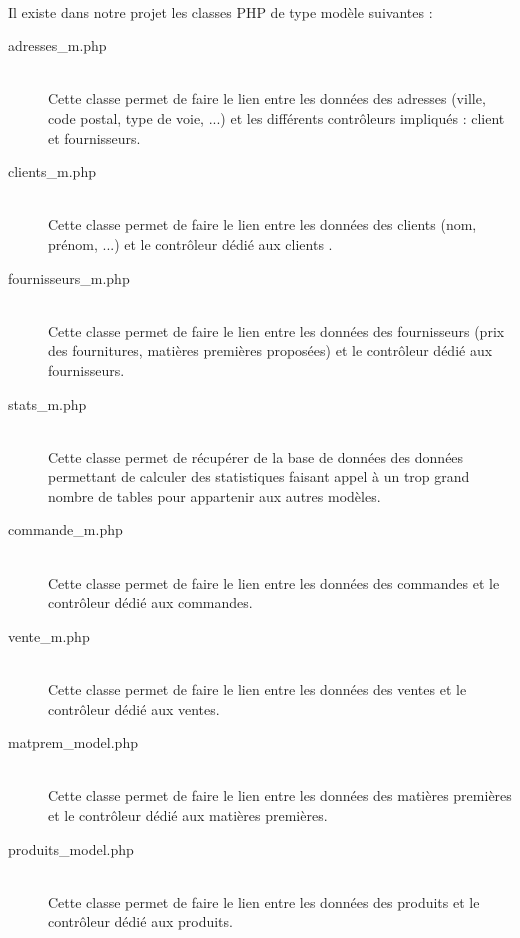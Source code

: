     \paragraph{}
        Il existe dans notre projet les classes PHP de type modèle suivantes :
        \begin{description}
            \item[adresses\_m.php]\hfill \\
                Cette classe permet de faire le lien entre les données des
                adresses (ville, code postal, type de voie, ...) et les
                différents contrôleurs impliqués : client et fournisseurs.
            \item[clients\_m.php]\hfill \\
                Cette classe permet de faire le lien entre les données des
                clients (nom, prénom, ...) et le contrôleur dédié aux clients
                .
            \item[fournisseurs\_m.php]\hfill \\
                Cette classe permet de faire le lien entre les données des
                fournisseurs (prix des fournitures, matières premières
                proposées) et le contrôleur dédié aux fournisseurs.
            \item[stats\_m.php]\hfill \\
                Cette classe permet de récupérer de la base de données des
                données permettant de calculer des statistiques faisant appel
                à un trop grand nombre de tables pour appartenir aux autres
                modèles.
            \item[commande\_m.php]\hfill \\
                Cette classe permet de faire le lien
                entre les données des commandes et le contrôleur dédié aux
                commandes.
            \item[vente\_m.php]\hfill \\
                Cette classe permet de faire le lien entre les données des
                ventes et le contrôleur dédié aux ventes.
            \item[matprem\_model.php]\hfill \\
                Cette classe permet de faire le lien entre les données des
                matières premières et le contrôleur dédié aux matières
                premières.
            \item[produits\_model.php]\hfill \\
                Cette classe permet de faire le lien entre les données des
                produits et le contrôleur dédié aux produits.
        \end{description}


